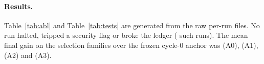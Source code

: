 \paragraph{Results.} Table~\ref{tab:abl} and Table~\ref{tab:tests} are generated from the raw per-run files. No run halted, tripped a security flag or broke the ledger (\BadRuns{} such runs). The mean final gain on the selection families over the frozen cycle-0 anchor was \GainAZero{} (A0), \GainAOne{} (A1), \GainATwo{} (A2) and \GainAThree{} (A3).

\begin{table}[t]
\centering\small
\caption{Arms, mean $\pm$ SD over seeds. Gain is the final pass rate minus the anchor's, on fresh batches shared by all arms. Tokens include yield tests.}
\label{tab:abl}

\end{table}

\begin{table}[t]
\centering\small
\caption{Pre-registered contrasts (paired by seed; one-sided sign-flip p; Holm over H1--H3).}
\label{tab:tests}

\end{table}

